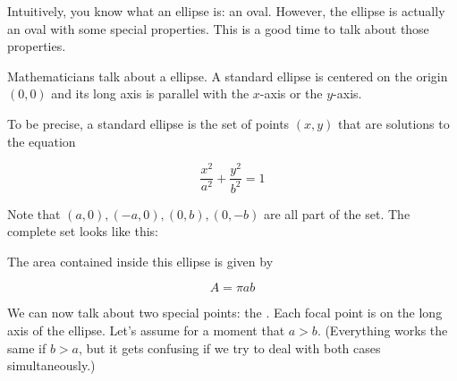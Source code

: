 Intuitively, you know what an ellipse is: an oval. However, the
ellipse is actually an oval with some special properties. This is a
good time to talk about those properties.

Mathematicians talk about a  ellipse. A standard ellipse is
centered on the origin $(0,0)$ and its long axis is parallel with the
$x$-axis or the $y$-axis.

\begin{mdframed}[style=important, frametitle={Equation for a Standard Ellipse}]

  To be precise, a standard ellipse is the set of points $(x, y)$ that
  are solutions to the equation

  $$\frac{x^2}{a^2} + \frac{y^2}{b^2} = 1$$


  Note that $(a,0), (-a, 0), (0, b), (0,-b)$ are all part of the
  set. The complete set looks like this:


  The area contained inside this ellipse is given by

  $$A = \pi a b$$


\end{mdframed}


We can now talk about two special points: the . Each
focal point is on the long axis of the ellipse. Let's assume for a
moment that $a > b$. (Everything works the same if $b > a$, but it
gets confusing if we try to deal with both cases simultaneously.)

